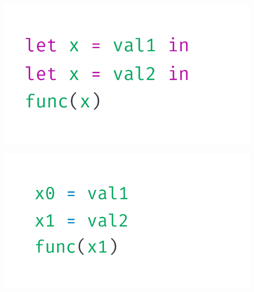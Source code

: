 \documentclass[a1,portrait]{a1poster}
\begin{document}
\begin{multicols}{2}


\begin{multicols}{3}

\begin{minipage}[b]{1\linewidth}
\begin{center}
\includegraphics[width=0.9\linewidth, trim={0.2cm 0.2cm 0.2cm 0.2cm}, clip]{figs/let.png}
\end{center}
\end{minipage}

\begin{minipage}[b]{1\linewidth}
\begin{center}
\includegraphics[width=0.9\linewidth, trim={0.2cm 0.3cm 0.2cm 0.2cm}, clip]{figs/let-by-mangling.png}
\end{center}
\end{minipage}



\end{multicols}
\end{multicols}
\end{document}
